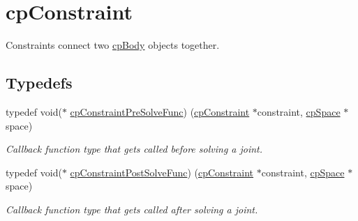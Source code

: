 \hypertarget{group__cp_constraint}{}\section{cp\+Constraint}
\label{group__cp_constraint}


Constraints connect two \hyperlink{structcp_body}{cp\+Body} objects together.  


\subsection*{Typedefs}
\begin{DoxyCompactItemize}
\item 
\hypertarget{group__cp_constraint_gaf6038a155d58f45d6ab977dd1b1398de}{}typedef void($\ast$ \hyperlink{group__cp_constraint_gaf6038a155d58f45d6ab977dd1b1398de}{cp\+Constraint\+Pre\+Solve\+Func}) (\hyperlink{structcp_constraint}{cp\+Constraint} $\ast$constraint, \hyperlink{structcp_space}{cp\+Space} $\ast$space)\label{group__cp_constraint_gaf6038a155d58f45d6ab977dd1b1398de}

\begin{DoxyCompactList}\small\item\em Callback function type that gets called before solving a joint. \end{DoxyCompactList}\item 
\hypertarget{group__cp_constraint_ga2208378297a7265d0cc69f31697961b9}{}typedef void($\ast$ \hyperlink{group__cp_constraint_ga2208378297a7265d0cc69f31697961b9}{cp\+Constraint\+Post\+Solve\+Func}) (\hyperlink{structcp_constraint}{cp\+Constraint} $\ast$constraint, \hyperlink{structcp_space}{cp\+Space} $\ast$space)\label{group__cp_constraint_ga2208378297a7265d0cc69f31697961b9}

\begin{DoxyCompactList}\small\item\em Callback function type that gets called after solving a joint. \end{DoxyCompactList}\end{DoxyCompactItemize}
